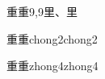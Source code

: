 \begin{entry}{重重}{9,9}{⾥、⾥}
  \begin{phonetics}{重重}{chong2chong2}
  \end{phonetics}
  \begin{phonetics}{重重}{zhong4zhong4}
  \end{phonetics}
\end{entry}
